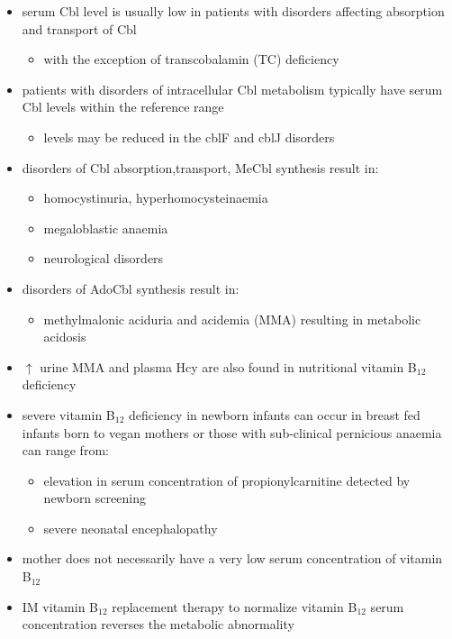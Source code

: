 \documentclass{scrartcl}
\begin{document}
\begin{itemize}
\item serum Cbl level is usually low in patients with disorders affecting
absorption and transport of Cbl
\begin{itemize}
\item with the exception of transcobalamin (TC) deficiency
\end{itemize}
\item patients with disorders of intracellular Cbl metabolism typically
have serum Cbl levels within the reference range
\begin{itemize}
\item levels may be reduced in the cblF and cblJ disorders
\end{itemize}
\item disorders of Cbl absorption,transport, MeCbl synthesis result in:
\begin{itemize}
\item homocystinuria, hyperhomocysteinaemia
\item megaloblastic anaemia
\item neurological disorders
\end{itemize}
\item disorders of AdoCbl synthesis result in:
\begin{itemize}
\item methylmalonic aciduria and acidemia (MMA) resulting in metabolic
acidosis
\end{itemize}
\item \(\uparrow\) urine MMA and plasma Hcy are also found in nutritional
vitamin B\(_{\text{12}}\) deficiency
\item severe vitamin B\(_{\text{12}}\) deficiency in newborn infants can occur in
breast fed infants born to vegan mothers or those with sub-clinical
pernicious anaemia can range from:
\begin{itemize}
\item elevation in serum concentration of propionylcarnitine detected by
newborn screening
\item severe neonatal encephalopathy
\end{itemize}
\item mother does not necessarily have a very low serum concentration of
vitamin B\(_{\text{12}}\)
\item IM vitamin B\(_{\text{12}}\) replacement therapy to normalize vitamin B\(_{\text{12}}\) serum
concentration reverses the metabolic abnormality
\end{itemize}
\end{document}
